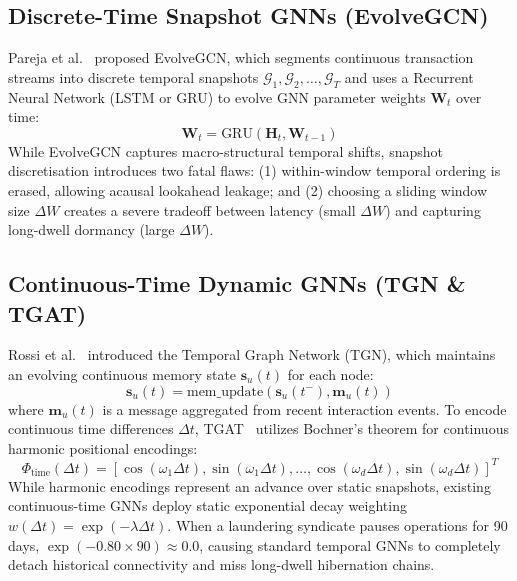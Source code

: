 \subsection{Discrete-Time Snapshot GNNs (EvolveGCN)}
Pareja et al.~\cite{pareja2020evolvegcn} proposed EvolveGCN, which segments continuous transaction streams into discrete temporal snapshots $\mathcal{G}_1, \mathcal{G}_2, \dots, \mathcal{G}_T$ and uses a Recurrent Neural Network (LSTM or GRU) to evolve GNN parameter weights $\mathbf{W}_t$ over time:
\begin{equation}
\mathbf{W}_t = \text{GRU}\left( \mathbf{H}_t, \mathbf{W}_{t-1} \right)
\end{equation}
While EvolveGCN captures macro-structural temporal shifts, snapshot discretisation introduces two fatal flaws: (1) within-window temporal ordering is erased, allowing acausal lookahead leakage; and (2) choosing a sliding window size $\Delta W$ creates a severe tradeoff between latency (small $\Delta W$) and capturing long-dwell dormancy (large $\Delta W$).

\subsection{Continuous-Time Dynamic GNNs (TGN \& TGAT)}
Rossi et al.~\cite{rossi2020temporal} introduced the Temporal Graph Network (TGN), which maintains an evolving continuous memory state $\mathbf{s}_u(t)$ for each node:
\begin{equation}
\mathbf{s}_u(t) = \text{mem\_update}\left( \mathbf{s}_u(t^-), \mathbf{m}_u(t) \right)
\end{equation}
where $\mathbf{m}_u(t)$ is a message aggregated from recent interaction events. To encode continuous time differences $\Delta t$, TGAT~\cite{xu2020inductive} utilizes Bochner's theorem for continuous harmonic positional encodings:
\begin{equation}
\Phi_{\text{time}}(\Delta t) = \left[ \cos(\omega_1 \Delta t), \sin(\omega_1 \Delta t), \dots, \cos(\omega_d \Delta t), \sin(\omega_d \Delta t) \right]^T
\end{equation}
While harmonic encodings represent an advance over static snapshots, existing continuous-time GNNs deploy static exponential decay weighting $w(\Delta t) = \exp(-\lambda \Delta t)$. When a laundering syndicate pauses operations for 90 days, $\exp(-0.80 \times 90) \approx 0.0$, causing standard temporal GNNs to completely detach historical connectivity and miss long-dwell hibernation chains.

